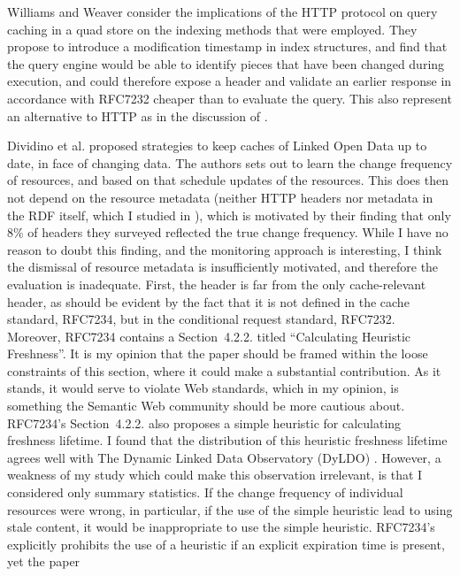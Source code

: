 Williams and Weaver \cite{kaseicache} consider the implications of the
HTTP protocol on query caching in a quad store on the indexing methods
that were employed. They propose to introduce a modification timestamp
in index structures, and find that the query engine would be able to
identify pieces that have been changed during execution, and could
therefore expose a  header and validate an
earlier response in accordance with RFC7232 \cite{rfc7232} cheaper
than to evaluate the query. This also represent an alternative to HTTP
 as in the discussion of \cite{papailiou2015graph}.

Dividino et al. \cite{Dividino2015} proposed strategies to keep caches
of Linked Open Data up to date, in face of changing data. The authors
sets out to learn the change frequency of resources, and based on that
schedule updates of the resources. This does then not depend on the
resource metadata (neither HTTP headers nor metadata in the RDF
itself, which I studied in \cite{kjernsmo_survey_2015}), which is
motivated by their finding that only 8\% of 
headers they surveyed reflected the true change frequency. While I
have no reason to doubt this finding, and the monitoring approach is
interesting, I think the dismissal of resource metadata is
insufficiently motivated, and therefore the evaluation is
inadequate. First, the  header is far from the
only cache-relevant header, as should be evident by the fact that it
is not defined in the cache standard, RFC7234, but in the conditional
request standard, RFC7232. Moreover, RFC7234 contains a Section~4.2.2.
titled ``Calculating Heuristic Freshness''. It is my opinion that the
paper should be framed within the loose constraints of this section,
where it could make a substantial contribution. As it stands, it would
serve to violate Web standards, which in my opinion, is something the
Semantic Web community should be more cautious about. RFC7234's
Section~4.2.2. also proposes a simple heuristic for calculating
freshness lifetime. I found that the distribution of this heuristic
freshness lifetime agrees well with The Dynamic Linked Data
Observatory (DyLDO) \cite{dyldo2}. However, a weakness of my study
which could make this observation irrelevant, is that I considered
only summary statistics. If the change frequency of individual
resources were wrong, in particular, if the use of the simple
heuristic lead to using stale content, it would be inappropriate to
use the simple heuristic.  RFC7234's explicitly prohibits the use of a
heuristic if an explicit expiration time is present, yet the paper
